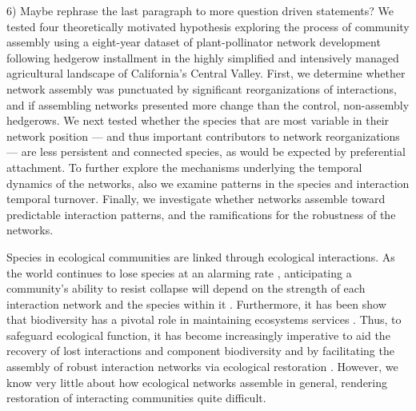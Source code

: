 \documentclass[12pt]{article}
\begin{document}
6) Maybe rephrase the last paragraph to more question driven statements?
We tested four theoretically motivated hypothesis exploring the process of community assembly using a eight-year
dataset of plant-pollinator network development following hedgerow
installment in the highly simplified and intensively managed
agricultural landscape of California's Central Valley. First,
we determine whether network assembly was punctuated by significant
reorganizations of interactions, and if assembling networks presented more change than the control, non-assembly hedgerows. We next tested whether the species
that are most variable in their network position --- and thus
important contributors to network reorganizations --- are less
persistent and connected species, as would be expected by preferential
attachment. To further explore the mechanisms underlying the temporal
dynamics of the networks, also we examine patterns in the species and
interaction temporal turnover. Finally, we investigate whether
networks assemble toward predictable interaction patterns, and the
ramifications for the robustness of the networks. 

Species in ecological communities are linked through ecological
interactions. As the world continues to lose species at an alarming
rate \citep{dunn2009sixth, barnosky2011has}, anticipating a
community's ability to resist collapse will depend on the strength of
each interaction network and the species within it \citep{Memmott2004,
  Rezende2007, Bascompte2009, Thebault2010}. Furthermore, it has been
show that biodiversity has a pivotal role in maintaining ecosystems
services \citep{cardinale-2012-59}. Thus, to safeguard ecological
function, it has become increasingly imperative to aid the recovery of
lost interactions and component biodiversity and by facilitating the
assembly of robust interaction networks via ecological restoration
\citep{menz-2010-4}. However, we know very little about how ecological
networks assemble in general, rendering restoration of interacting
communities quite difficult.
\end{document}
